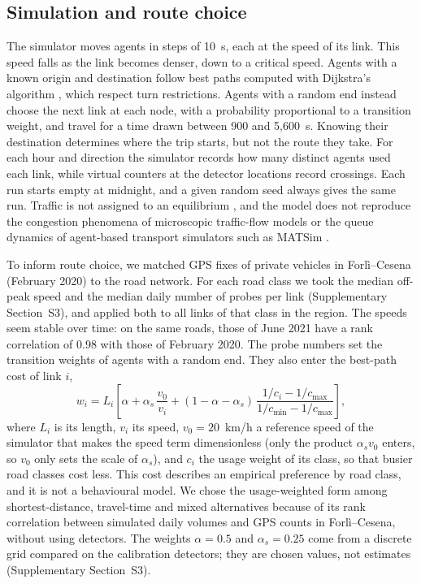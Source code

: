 \documentclass[preprint,11pt,a4paper]{elsarticle}
\begin{document}
\subsection{Simulation and route choice}
The simulator moves agents in steps of 10~s, each at the speed of its link. This speed falls as the link becomes denser, down to a critical speed. Agents with a known origin and destination follow best paths computed with Dijkstra's algorithm \cite{dijkstra1959}, which respect turn restrictions. Agents with a random end instead choose the next link at each node, with a probability proportional to a transition weight, and travel for a time drawn between 900 and 5,600~s. Knowing their destination determines where the trip starts, but not the route they take. For each hour and direction the simulator records how many distinct agents used each link, while virtual counters at the detector locations record crossings. Each run starts empty at midnight, and a given random seed always gives the same run. Traffic is not assigned to an equilibrium \cite{wardrop1952}, and the model does not reproduce the congestion phenomena of microscopic traffic-flow models \cite{treiber2013,lopez2018} or the queue dynamics of agent-based transport simulators such as MATSim \cite{horni2016}.

To inform route choice, we matched GPS fixes of private vehicles in Forl\`i--Cesena (February 2020) to the road network. For each road class we took the median off-peak speed and the median daily number of probes per link (Supplementary Section~S3), and applied both to all links of that class in the region. The speeds seem stable over time: on the same roads, those of June 2021 have a rank correlation of 0.98 with those of February 2020. The probe numbers set the transition weights of agents with a random end. They also enter the best-path cost of link $i$,
\begin{equation}
w_i = L_i\left[\alpha + \alpha_s\,\frac{v_0}{v_i} + (1-\alpha-\alpha_s)\,\frac{1/c_i - 1/c_{\max}}{1/c_{\min} - 1/c_{\max}}\right],
\label{eq:route_cost}
\end{equation}
where $L_i$ is its length, $v_i$ its speed, $v_0=20$~km/h a reference speed of the simulator that makes the speed term dimensionless (only the product $\alpha_s v_0$ enters, so $v_0$ only sets the scale of $\alpha_s$), and $c_i$ the usage weight of its class, so that busier road classes cost less. This cost describes an empirical preference by road class, and it is not a behavioural model. We chose the usage-weighted form among shortest-distance, travel-time and mixed alternatives because of its rank correlation between simulated daily volumes and GPS counts in Forl\`i--Cesena, without using detectors. The weights $\alpha=0.5$ and $\alpha_s=0.25$ come from a discrete grid compared on the calibration detectors; they are chosen values, not estimates (Supplementary Section~S3).
\end{document}
